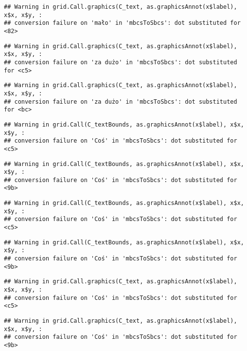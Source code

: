 \documentclass[
]{book}
\begin{document}
\begin{verbatim}
## Warning in grid.Call.graphics(C_text, as.graphicsAnnot(x$label), x$x, x$y, :
## conversion failure on 'mało' in 'mbcsToSbcs': dot substituted for <82>
\end{verbatim}

\begin{verbatim}
## Warning in grid.Call.graphics(C_text, as.graphicsAnnot(x$label), x$x, x$y, :
## conversion failure on 'za dużo' in 'mbcsToSbcs': dot substituted for <c5>
\end{verbatim}

\begin{verbatim}
## Warning in grid.Call.graphics(C_text, as.graphicsAnnot(x$label), x$x, x$y, :
## conversion failure on 'za dużo' in 'mbcsToSbcs': dot substituted for <bc>
\end{verbatim}

\begin{verbatim}
## Warning in grid.Call(C_textBounds, as.graphicsAnnot(x$label), x$x, x$y, :
## conversion failure on 'Coś' in 'mbcsToSbcs': dot substituted for <c5>
\end{verbatim}

\begin{verbatim}
## Warning in grid.Call(C_textBounds, as.graphicsAnnot(x$label), x$x, x$y, :
## conversion failure on 'Coś' in 'mbcsToSbcs': dot substituted for <9b>
\end{verbatim}

\begin{verbatim}
## Warning in grid.Call(C_textBounds, as.graphicsAnnot(x$label), x$x, x$y, :
## conversion failure on 'Coś' in 'mbcsToSbcs': dot substituted for <c5>
\end{verbatim}

\begin{verbatim}
## Warning in grid.Call(C_textBounds, as.graphicsAnnot(x$label), x$x, x$y, :
## conversion failure on 'Coś' in 'mbcsToSbcs': dot substituted for <9b>
\end{verbatim}

\begin{verbatim}
## Warning in grid.Call.graphics(C_text, as.graphicsAnnot(x$label), x$x, x$y, :
## conversion failure on 'Coś' in 'mbcsToSbcs': dot substituted for <c5>
\end{verbatim}

\begin{verbatim}
## Warning in grid.Call.graphics(C_text, as.graphicsAnnot(x$label), x$x, x$y, :
## conversion failure on 'Coś' in 'mbcsToSbcs': dot substituted for <9b>
\end{verbatim}
\end{document}
